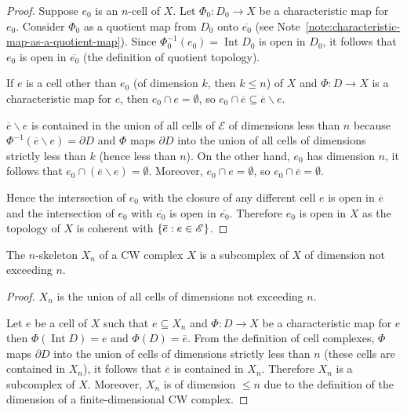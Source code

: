 \begin{proof}
	Suppose $e_{0}$ is an $n$-cell of $X$. Let $\Phi_{0}: D_{0} \to X$ be a characteristic map for $e_{0}$. Consider $\Phi_{0}$ as a quotient map from $D_{0}$ onto $\overline{e_{0}}$ (see Note~\ref{note:characteristic-map-as-a-quotient-map}). Since $\Phi_{0}^{-1}(e_{0}) = \operatorname{Int} D_{0}$ is open in $D_{0}$, it follows that $e_{0}$ is open in $\overline{e_{0}}$ (the definition of quotient topology).

	If $e$ is a cell other than $e_{0}$ (of dimension $k$, then $k \leq n$) of $X$ and $\Phi: D \to X$ is a characteristic map for $e$, then $e_{0} \cap e = \emptyset$, so $e_{0} \cap \overline{e} \subseteq \overline{e} \smallsetminus e$.

	$\overline{e}\smallsetminus e$ is contained in the union of all cells of $\mathscr{E}$ of dimensions less than $n$ because $\Phi^{-1}(\overline{e}\smallsetminus e) = \partial D$ and $\Phi$ maps $\partial D$ into the union of all cells of dimensions strictly less than $k$ (hence less than $n$). On the other hand, $e_{0}$ has dimension $n$, it follows that $e_{0} \cap (\overline{e}\smallsetminus e) = \emptyset$. Moreover, $e_{0} \cap e = \emptyset$, so $e_{0} \cap \overline{e} = \emptyset$.

	Hence the intersection of $e_{0}$ with the closure of any different cell $e$ is open in $\overline{e}$ and the intersection of $e_{0}$ with $\overline{e_{0}}$ is open in $\overline{e_{0}}$. Therefore $e_{0}$ is open in $X$ as the topology of $X$ is coherent with $\left\{{ \overline{e}: e \in \mathscr{E} }\right\}$.
\end{proof}

\begin{note}\label{note:n-skeleton}
	The $n$-skeleton $X_{n}$ of a CW complex $X$ is a subcomplex of $X$ of dimension not exceeding $n$.
\end{note}

\begin{proof}
	$X_{n}$ is the union of all cells of dimensions not exceeding $n$.

	Let $e$ be a cell of $X$ such that $e\subseteq X_{n}$ and $\Phi: D \to X$ be a characteristic map for $e$ then $\Phi(\operatorname{Int} D) = e$ and $\Phi(D) = \overline{e}$. From the definition of cell complexes, $\Phi$ maps $\partial D$ into the union of cells of dimensions strictly less than $n$ (these cells are contained in $X_{n}$), it follows that $\overline{e}$ is contained in $X_{n}$. Therefore $X_{n}$ is a subcomplex of $X$. Moreover, $X_{n}$ is of dimension $\leq n$ due to the definition of the dimension of a finite-dimensional CW complex.
\end{proof}

